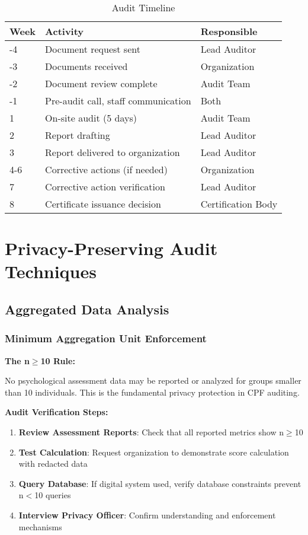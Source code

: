 \documentclass[11pt,a4paper]{article}
\begin{document}
\begin{table}[h]
\centering
\caption{Audit Timeline}
\small
\begin{tabular}{lll}
\toprule
\textbf{Week} & \textbf{Activity} & \textbf{Responsible} \\
\midrule
-4 & Document request sent & Lead Auditor \\
-3 & Documents received & Organization \\
-2 & Document review complete & Audit Team \\
-1 & Pre-audit call, staff communication & Both \\
1 & On-site audit (5 days) & Audit Team \\
2 & Report drafting & Lead Auditor \\
3 & Report delivered to organization & Lead Auditor \\
4-6 & Corrective actions (if needed) & Organization \\
7 & Corrective action verification & Lead Auditor \\
8 & Certificate issuance decision & Certification Body \\
\bottomrule
\end{tabular}
\end{table}

\section{Privacy-Preserving Audit Techniques}

\subsection{Aggregated Data Analysis}

\subsubsection{Minimum Aggregation Unit Enforcement}

\textbf{The n$\geq$10 Rule:}

No psychological assessment data may be reported or analyzed for groups smaller than 10 individuals. This is the fundamental privacy protection in CPF auditing.

\textbf{Audit Verification Steps:}

\begin{enumerate}
\item \textbf{Review Assessment Reports}: Check that all reported metrics show n$\geq$10
\item \textbf{Test Calculation}: Request organization to demonstrate score calculation with redacted data
\item \textbf{Query Database}: If digital system used, verify database constraints prevent n$<$10 queries
\item \textbf{Interview Privacy Officer}: Confirm understanding and enforcement mechanisms
\end{enumerate}
\end{document}
